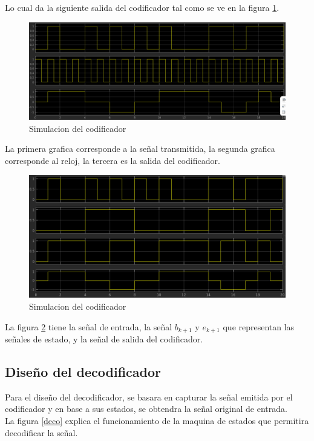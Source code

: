 Lo cual da la siguiente salida del codificador tal como se ve en la figura \ref{sico}.

\begin{figure}[H]
    \centering
    \includegraphics[width=1\textwidth]{laboratorioMLT3/imagenes/simulacionCoder.PNG}
    \caption{\label{sico}Simulacion del codificador}
\end{figure}

La primera grafica corresponde a la señal transmitida, la segunda grafica corresponde al reloj, la tercera es la salida del codificador.

\begin{figure}[H]
    \centering
    \includegraphics[width=1\textwidth]{laboratorioMLT3/imagenes/simulacionCoder2.PNG}
    \caption{\label{sico2}Simulacion del codificador}
\end{figure}

La figura \ref{sico2} tiene la señal de entrada, la señal $b_{k+1}$ y $e_{k+1}$ que representan las señales de estado, y la señal de salida del codificador.

\subsection{Diseño del decodificador}

Para el diseño del decodificador, se basara en capturar la señal emitida por el codificador y en base a sus estados, se obtendra la señal original de entrada.\\
La figura \ref{deco} explica el funcionamiento de la maquina de estados que permitira decodificar la señal.

